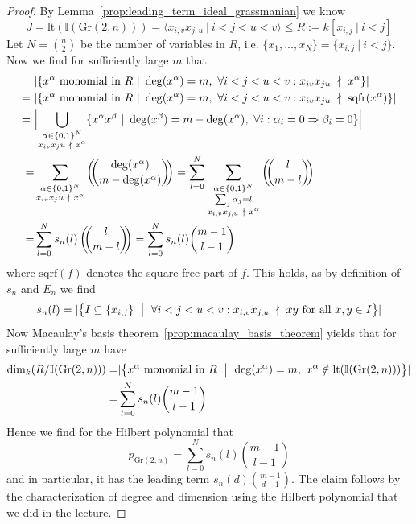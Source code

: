 \documentclass{scrartcl}
\newcommand{\I}{\mathbb{I}}
\newcommand{\Gr}{\mathrm{Gr}}
\theoremstyle{definition}
\begin{document}
\begin{proof}
    By Lemma~\ref{prop:leading_term_ideal_grassmanian} we know
    \begin{equation*}
        J = \mathrm{lt}(\I(\Gr(2, n))) = \langle x_{i, v} x_{j, u} \ | \ i < j < u < v \rangle \leq R := k[x_{i, j} \ | \ i < j]
    \end{equation*}
    Let $N = {n \choose 2}$ be the number of variables in $R$, i.e. $\{x_1, ..., x_N\} = \{ x_{i, j} \ | \ i < j \}$. Now we find for sufficiently large $m$ that
    \begin{align*}
        &|\{ x^\alpha \ \text{monomial in $R$} \ | \ \deg(x^\alpha) = m, \ \forall i < j < u < v: x_{iv} x_{ju} \ \nmid \ x^\alpha \}| \\
        =\ &|\{ x^\alpha \ \text{monomial in $R$} \ | \ \deg(x^\alpha) = m, \ \forall i < j < u < v: x_{iv} x_{ju} \ \nmid \ \mathrm{sqfr}(x^\alpha) \}| \\
        =\ &\Bigl| \bigcup_{\substack{\alpha \in \{0, 1\}^N\\x_{iv} x_ju \ \nmid \ x^\alpha}} \{ x^\alpha x^\beta \ | \ \deg(x^\beta) = m - \deg(x^\alpha), \ \forall i: \alpha_i = 0 \Rightarrow \beta_i = 0 \} \Bigr| \\
        =& \sum_{\substack{\alpha \in \{0, 1\}^N\\x_{iv} x_ju \ \nmid \ x^\alpha}} \left(\!\!{\deg(x^\alpha) \choose m - \deg(x^\alpha)}\!\!\right) = \sum_{l = 0}^N \sum_{\substack{\alpha \in \{0, 1\}^N\\\sum_j \alpha_j = l\\x_{i, v} x_{j, u} \ \nmid \ x^\alpha}} \left(\!\!{ l \choose m - l }\!\!\right) \\
        =& \sum_{l = 0}^N s_n(l) \left(\!\!{ l \choose m - l }\!\!\right) = \sum_{l = 0}^N s_n(l) {m - 1 \choose l - 1}
    \end{align*}
    where $\mathrm{sqrf}(f)$ denotes the square-free part of $f$.
    This holds, as by definition of $s_n$ and $E_n$ we find
    \begin{equation*}
        s_n(l) = |\bigl\{ I \subseteq \{ x_{i, j} \} \ \bigm| \ \forall i < j < u < v: x_{i, v} x_{j, u} \ \nmid \ xy \ \text{for all} \ x, y \in I \bigr\}|
    \end{equation*}
    Now Macaulay's basis theorem~\ref{prop:macaulay_basis_theorem} yields that for sufficiently large $m$ have
    \begin{align*}
        \dim_k (R/\I(\Gr(2, n))) =& |\bigl\{ x^\alpha \ \text{monomial in $R$} \ \bigm| \ \deg(x^\alpha) = m, \ x^\alpha \notin \mathrm{lt}(\I(\Gr(2, n))) \bigr\}| \\
        =& \sum_{l = 0}^N s_n(l) {m - 1 \choose l - 1}
    \end{align*}
    Hence we find for the Hilbert polynomial that
    \begin{equation*}
        p_{\Gr(2, n)} = \sum_{l = 0}^N s_n(l) {m - 1 \choose l - 1}
    \end{equation*}
    and in particular, it has the leading term $s_n(d) {m - 1 \choose d - 1}$.
    The claim follows by the characterization of degree and dimension using the Hilbert polynomial that we did in the lecture.
\end{proof}
\end{document}

